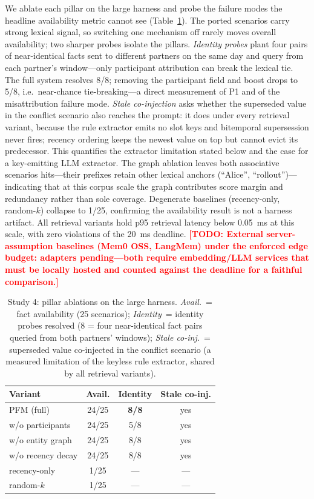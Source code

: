 \documentclass[letterpaper]{article}
\newcommand{\todo}[1]{\textbf{\textcolor{red}{[TODO: #1]}}}
\begin{document}
We ablate each pillar on the large harness and probe the failure modes
the headline availability metric cannot see (Table~\ref{tab:ablation}).
The ported scenarios carry strong lexical signal, so switching one
mechanism off rarely moves overall availability; two sharper probes
isolate the pillars. \emph{Identity probes} plant four pairs of
near-identical facts sent to different partners on the same day and
query from each partner's window---only participant attribution can
break the lexical tie. The full system resolves 8/8; removing the
participant field and boost drops to 5/8, i.e.\ near-chance
tie-breaking---a direct measurement of P1 and of the misattribution
failure mode. \emph{Stale co-injection} asks whether the superseded
value in the conflict scenario also reaches the prompt: it does under
every retrieval variant, because the rule extractor emits no slot keys
and bitemporal supersession never fires; recency ordering keeps the
newest value on top but cannot evict its predecessor. This quantifies
the extractor limitation stated below and the case for a key-emitting
LLM extractor. The graph ablation leaves both associative scenarios
hits---their prefixes retain other lexical anchors (``Alice'',
``rollout'')---indicating that at this corpus scale the graph
contributes score margin and redundancy rather than sole coverage.
Degenerate baselines (recency-only, random-$k$) collapse to 1/25,
confirming the availability result is not a harness artifact. All
retrieval variants hold p95 retrieval latency below 0.05~ms at this
scale, with zero violations of the 20~ms deadline.
\todo{External server-assumption baselines (Mem0 OSS, LangMem) under the
enforced edge budget: adapters pending---both require embedding/LLM
services that must be locally hosted and counted against the deadline
for a faithful comparison.}

\begin{table}[t]
\centering
\small
\begin{tabular}{@{}lccc@{}}
\toprule
Variant & Avail. & Identity & Stale co-inj. \\
\midrule
PFM (full)          & 24/25 & \textbf{8/8} & yes \\
w/o participants    & 24/25 & 5/8          & yes \\
w/o entity graph    & 24/25 & 8/8          & yes \\
w/o recency decay   & 24/25 & 8/8          & yes \\
recency-only        & 1/25  & ---          & --- \\
random-$k$          & 1/25  & ---          & --- \\
\bottomrule
\end{tabular}
\caption{Study 4: pillar ablations on the large harness.
\emph{Avail.}~= fact availability (25 scenarios); \emph{Identity}~=
identity probes resolved (8 = four near-identical fact pairs queried
from both partners' windows); \emph{Stale co-inj.}~= superseded value
co-injected in the conflict scenario (a measured limitation of the
keyless rule extractor, shared by all retrieval variants).}
\label{tab:ablation}
\end{table}
\end{document}

